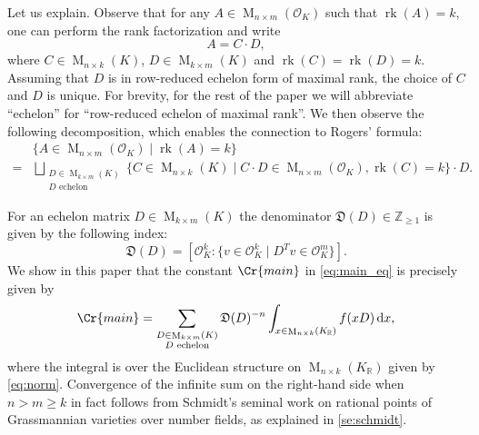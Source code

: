 \documentclass{amsart}
\theoremstyle{definition}
\theoremstyle{remark}
\newcommand{\OK}{\mathcal{O}_K}
\newcommand{\KR}{K_\mathbb{R}}
\newcommand{\diff}{\,\mathrm{d}}
\DeclareMathOperator{\M}{M}
\DeclareMathOperator{\rank}{rk}
\begin{document}
Let us explain. Observe that for any $A \in \M_{n \times m }(\OK)$ 
such that $\rank(A) =k$, one can perform the rank factorization and write 
\begin{equation}
    A = C \cdot D,
\end{equation}
where $C \in \M_{n \times k}(K)$, $D \in \M_{k \times m}(K)$ and $\rank(C) = \rank(D) = k$. Assuming that $D$ is in row-reduced echelon form of maximal rank, the choice of $C$ and $D$ is unique. 
For brevity, for the rest of the paper we will abbreviate ``echelon'' for  ``row-reduced echelon of maximal rank''.
We then observe the following decomposition, which enables the connection to Rogers' formula: 
\begin{align}
 & \{A \in \M_{n \times m }(\OK) \mid \rank(A) = k \}   \\
    = &  \bigsqcup_{ \substack{ D \in \M_{k \times m}(K) \\ D \text{ echelon }}}
    \{C  \in \M_{n \times k }(K) \mid  C \cdot D \in \M_{ n \times m }(\OK), \rank(C) =k \} \cdot D.
    \label{eq:bijection}
\end{align}

For an echelon matrix $D \in \M_{k \times m }(K)$ the denominator $\mathfrak{D}(D) \in \mathbb{Z}_{\geq 1}$ is given by the following index:
\begin{equation}
    \mathfrak{D}(D) = [ \OK^{k} :\{v \in  \OK^{k} \mid D^{T} v \in \OK^{m} \}].
    \label{de:denonimator}
\end{equation}
We show in this paper that the constant $\Cr{main}$ in \cref{eq:main_eq} is precisely given by
\begin{equation}
    \Cr{main} = \sum_{ \substack{ D \in \M_{k \times m}(K) \\ D \text{ echelon}} } \mathfrak{D}(D)^{-n}\int_{x \in \M_{n \times k}(\KR)} f(x D )  \diff x,
    \label{eq:value_of_c}
\end{equation}
where the integral is over the Euclidean structure on $\M_{n \times k}(\KR)$ given by \cref{eq:norm}. 
Convergence of the infinite sum on the right-hand side when $n > m \geq k$ in fact follows from Schmidt's seminal work \cite{S1967} on rational points of Grassmannian varieties over number fields, as explained in \cref{se:schmidt}.
\end{document}
